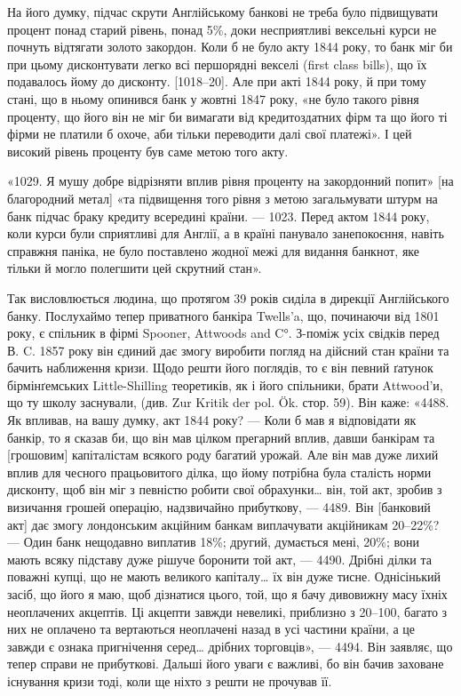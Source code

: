 На його думку, підчас скрути Англійському банкові не треба було підвищувати
процент понад старий рівень, понад 5\%, доки несприятливі вексельні
курси не почнуть відтягати золото закордон. Коли б не було акту 1844 року,
то банк міг би при цьому дисконтувати легко всі першорядні векселі (first class
bills), що їх подавалось йому до дисконту. [1018--20]. Але при акті 1844 року,
й при тому стані, що в ньому опинився банк у жовтні 1847 року, «не було
такого рівня проценту, що його він не міг би вимагати від кредитоздатних фірм
та що його ті фірми не платили б охоче, аби тільки переводити далі свої платежі».
І цей високий рівень проценту був саме метою того акту.

«1029. Я мушу добре відрізняти вплив рівня проценту на закордонний
попит» [на благородний метал] «та підвищення того рівня з метою загальмувати
штурм на банк підчас браку кредиту всередині країни. — 1023. Перед актом
1844 року, коли курси були сприятливі для Англії, а в країні панувало занепокоєння,
навіть справжня паніка, не було поставлено жодної межі для видання
банкнот, яке тільки й могло полегшити цей скрутний стан».

Так висловлюється людина, що протягом 39 років сиділа в дирекції Англійського
банку. Послухаймо тепер приватного банкіра Twells’a, що, починаючи
від 1801 року, є спільник в фірмі Spooner, Attwoods and C°. З-поміж усіх свідків
перед В. C. 1857 року він єдиний дає змогу виробити погляд на дійсний стан
країни та бачить наближення кризи. Щодо решти його поглядів, то є він певний
ґатунок бірмінґемських Little-Shilling теоретиків, як і його спільники, брати
Attwood’и, що ту школу заснували, (див. Zur Kritik der pol. Ök. стор. 59). Він
каже: «4488. Як впливав, на вашу думку, акт 1844 року? — Коли б мав я
відповідати як банкір, то я сказав би, що він мав цілком прегарний вплив,
давши банкірам та [грошовим] капіталістам всякого роду багатий урожай. Але
він мав дуже лихий вплив для чесного працьовитого ділка, що йому потрібна
була сталість норми дисконту, щоб він міг з певністю робити свої обрахунки\dots{}
він, той акт, зробив з визичання грошей операцію, надзвичайно прибуткову, —
4489. Він [банковий акт] дає змогу лондонським акційним банкам виплачувати
акційникам 20--22\%? — Один банк нещодавно виплатив 18\%; другий, думається
мені, 20\%; вони мають всяку підставу дуже рішуче боронити той акт, — 4490. Дрібні ділки та поважні
купці, що не мають великого капіталу\dots{} їх він
дуже тисне. Однісінький засіб, що його я маю, щоб дізнатися цього, той, що я
бачу дивовижну масу їхніх неоплачених акцептів. Ці акцепти завжди невеликі,
приблизно з 20--100, багато з них не оплачено та вертаються неоплачені
назад в усі частини країни, а це завжди є ознака пригнічення серед\dots{}
дрібних торговців», — 4494. Він заявляє, що тепер справи не прибуткові. Дальші
його уваги є важливі, бо він бачив заховане існування кризи тоді, коли ще
ніхто з решти не прочував її.

